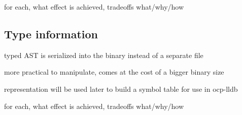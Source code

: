 for each, what effect is achieved, tradeoffs
what/why/how

\subsection{Type information}


typed AST is serialized into the binary instead of a separate file

more practical to manipulate, comes at the cost of a bigger binary size

representation will be used later to build a symbol table for use in ocp-lldb


for each, what effect is achieved, tradeoffs
what/why/how

